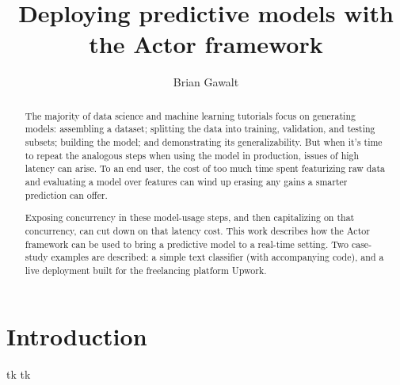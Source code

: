 \documentclass{article}
\begin{document}
\title{Deploying predictive models with the Actor framework}
\author{Brian Gawalt}

\maketitle


\begin{abstract}
The majority of data science and machine learning tutorials focus on generating models: assembling a dataset; splitting the data into training, validation, and testing subsets; building the model; and demonstrating its generalizability. But when it's time to repeat the analogous steps when using the model in production, issues of high latency can arise. To an end user, the cost of too much time spent featurizing raw data and evaluating a model over features can wind up erasing any gains a smarter prediction can offer. 

Exposing concurrency in these model-usage steps, and then capitalizing on that concurrency, can cut down on that latency cost. This work describes how the Actor framework can be used to bring a predictive model to a real-time setting. Two case-study examples are described: a simple text classifier (with accompanying code), and a live deployment built for the freelancing platform Upwork.
\end{abstract}

\section{Introduction}

tk tk
\end{document}
